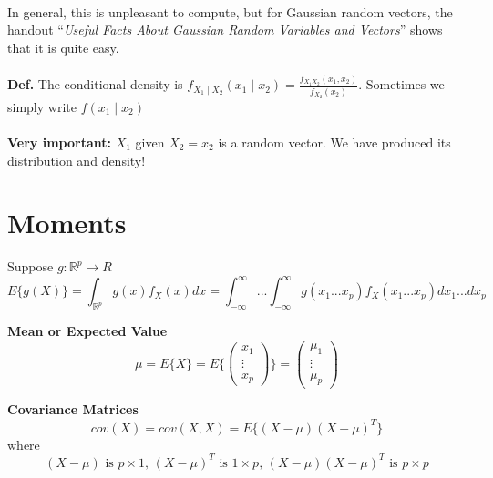 \documentclass{article}
\newcommand{\real}{\mathbb R}  %
\begin{document}
        \noindent
        \\
        In general, this is unpleasant to compute, but for Gaussian random vectors, the handout ``\textit{Useful Facts About Gaussian Random Variables and Vectors}'' shows that it is quite easy.\\ \\
       \textbf{Def.} The conditional density is $f_{X_1\mid X_2}(x_1 \mid x_2)=\frac{f_{X_1X_2}(x_1,x_2)}{f_{X_2}(x_2)}$.
        Sometimes we simply write $f(x_1 \mid x_2)$\\ \\

        \noindent         \textbf{Very important:}
        $X_1$ given $X_2=x_2$ is a random vector. We have produced its distribution and density!


%
%
%
%
%
%

       \newpage


        \section{Moments} Suppose $g: \real^p \rightarrow R$
        $$E\{g(X)\}=\int_{\real^p}g(x)f_X(x)dx=\int_{-\infty}^{\infty}...\int_{-\infty}^{\infty}g(x_1...x_p)f_X(x_1...x_p)dx_1...dx_p$$

        \noindent
        \textbf{Mean or Expected Value}$$\mu=E\{X\}=E\{\left( \begin{array}{ccc}x_1\\\vdots\\x_p\end{array} \right)\}=\left( \begin{array}{ccc}\mu_1\\\vdots\\\mu_p \end{array} \right)$$

        \noindent
        \textbf{Covariance Matrices}$$cov(X)=cov(X,X)=E\{(X-\mu)(X-\mu)^T\}$$
        where
        $$(X-\mu) \mbox{ is }p\times 1 \mbox{, } (X-\mu)^T \mbox{ is }1\times p\mbox{, } (X-\mu)(X-\mu)^T \mbox{ is }p\times p$$
\end{document}
